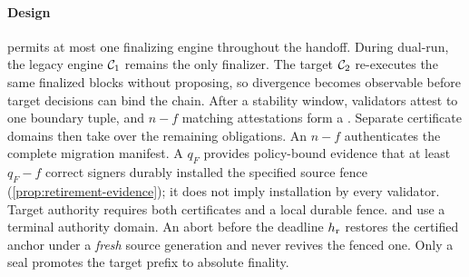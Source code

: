 \paragraph{Design}
\sage{} permits at most one finalizing engine throughout the handoff. During dual-run, the legacy engine
$\mathcal{C}_1$ remains the only finalizer. The target $\mathcal{C}_2$ re-executes the same finalized blocks without
proposing, so divergence becomes observable before target decisions can bind the chain. After a
stability window, validators attest to one boundary tuple, and $n-f$ matching attestations form a
\CutCert. Separate certificate domains then take over the remaining obligations. An $n-f$ \ManCert{}
authenticates the complete migration manifest. A $q_F$ \FenceCert{} provides policy-bound evidence
that at least $q_F-f$ correct signers durably installed the specified source fence
(\cref{prop:retirement-evidence}); it does not imply installation by every validator.
Target authority requires both certificates and a local durable fence. \AbortCert{} and \SealCert{} use a
terminal authority domain. An abort before the deadline $h_{\mathrm r}$ restores the certified anchor under a
\emph{fresh} source generation and never revives the fenced one. Only a seal promotes the target
prefix to absolute finality.

